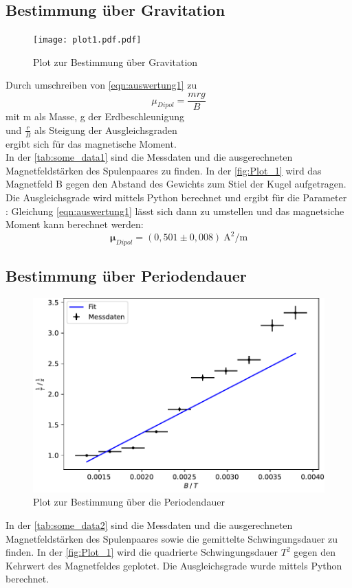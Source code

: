 \documentclass[
  bibliography=totoc,     %
  captions=tableheading,  %
  titlepage=firstiscover, %
]{scrartcl}
\begin{document}
  \subsection{Bestimmung über Gravitation}
  
  \begin{figure}
    \texttt{[image: plot1.pdf.pdf]}
    \caption{Plot zur Bestimmung über Gravitation}
    \label{fig:Plot_1}
  \end{figure}
  Durch umschreiben von \autoref{eqn:auswertung1} zu
  \begin{equation}
  \mu_{Dipol}=\frac{mrg}{B}
  \end{equation}
  mit m als Masse, g der Erdbeschleunigung \\und $\frac{r}{B}$ als Steigung der Ausgleichsgraden\\ ergibt sich für das magnetische Moment.\\
  In der \autoref{tab:some_data1} sind die Messdaten und die ausgerechneten Magnetfeldstärken des Spulenpaares zu finden. In der \autoref{fig:Plot_1} wird das Magnetfeld B 
  gegen den Abstand des Gewichts zum Stiel der Kugel aufgetragen. Die Ausgleichsgrade wird mittels Python berechnet und ergibt für die Parameter :
  Gleichung \eqref{eqn:auswertung1} lässt sich dann zu umstellen und das magnetsiche Moment kann berechnet werden:
  \begin{equation*}
    \symbf{\mu}_{Dipol} = (0,501 \pm 0,008) \: \text{A}^{2}/\text{m}
  \end{equation*}

  \newpage
  \subsection{Bestimmung über Periodendauer}
  
  \FloatBarrier
  \begin{figure}
    \includegraphics[scale=.6]{plot3.pdf}
    \caption{Plot zur Bestimmung über die Periodendauer}
    \label{fig:Plot_2}
  \end{figure}
  \FloatBarrier
  In der \autoref{tab:some_data2} sind die Messdaten und die ausgerechneten Magnetfeldstärken des Spulenpaares sowie die gemittelte Schwingungsdauer zu finden. 
  In der \autoref{fig:Plot_1} wird die quadrierte Schwingungsdauer $T^2$ gegen den Kehrwert des Magnetfeldes geplotet. Die Ausgleichsgrade wurde mittels Python berechnet. 
\end{document}
